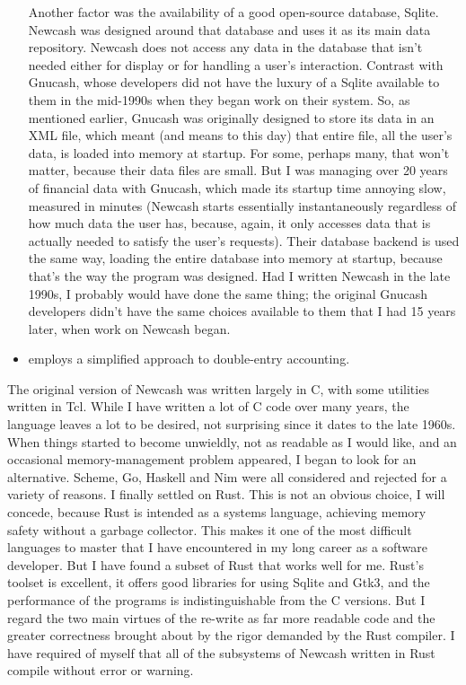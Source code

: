 \documentclass{report}
\begin{document}
\begin{itemize}
Another factor was the availability of a good open-source database, Sqlite. Newcash was designed around that database and uses it as its main data repository. Newcash does not access any data in the database that isn't needed either for display or for handling a user's interaction. Contrast with Gnucash, whose developers did not have the luxury of a Sqlite available to them in the mid-1990s when they began work on their system. So, as mentioned earlier, Gnucash was originally designed to store its data in an XML file, which meant (and means to this day) that entire file, all the user's data, is loaded into memory at startup. For some, perhaps many, that won't matter, because their data files are small. But I was managing over 20 years of financial data with Gnucash, which made its startup time annoying slow, measured in minutes (Newcash starts essentially instantaneously regardless of how much data the user has, because, again, it only accesses data that is actually needed to satisfy the user's requests). Their database backend is used the same way, loading the entire database into memory at startup, because that's the way the program was designed. Had I written Newcash in the late 1990s, I probably would have done the same thing; the original Gnucash developers  didn't have the same choices available to them that I had 15 years later, when work on Newcash began.
\item employs a simplified approach to double-entry accounting.
\end{itemize}

The original version of Newcash was written largely in C, with some utilities written in Tcl. While I have written a lot of C code over many years, the language leaves a lot to be desired, not surprising since it dates to the late 1960s. When things started to become unwieldly,  not as readable as I would like, and an occasional memory-management problem appeared, I began to look for an alternative. Scheme, Go, Haskell and Nim were all considered and rejected for a variety of reasons. I finally settled on Rust. This is not an obvious choice, I will concede, because Rust is intended as a systems language, achieving memory safety without a garbage collector. This makes it one of the most difficult languages to master that I have encountered in my long career as a software developer. But I have found a subset of Rust that works well for me. Rust's toolset is excellent, it offers good libraries for using Sqlite and Gtk3, and the performance of the programs is indistinguishable from the C versions. But I regard the two main virtues of the re-write as far more readable code and the greater correctness brought about by the rigor demanded by the Rust compiler. I have required of myself that all of the subsystems of Newcash written in Rust compile without error or warning.
\end{document}
